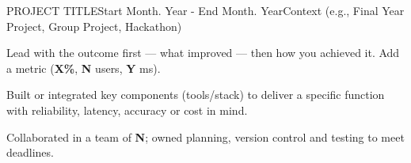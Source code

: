\begin{rSubsection}{PROJECT TITLE}{Start Month. Year - End Month. Year}{Context (e.g., Final Year Project, Group Project, Hackathon)}{}
\item Lead with the outcome first — what improved — then how you achieved it. Add a metric (\textbf{X\%}, \textbf{N} users, \textbf{Y} ms).
\item Built or integrated key components (tools/stack) to deliver a specific function with reliability, latency, accuracy or cost in mind.
\item Collaborated in a team of \textbf{N}; owned planning, version control and testing to meet deadlines.
\end{rSubsection}

